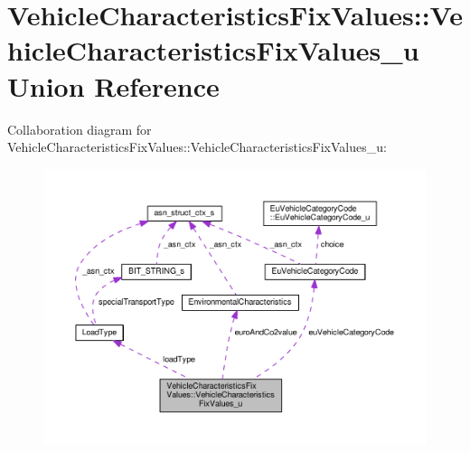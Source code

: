 \hypertarget{unionVehicleCharacteristicsFixValues_1_1VehicleCharacteristicsFixValues__u}{}\section{Vehicle\+Characteristics\+Fix\+Values\+:\+:Vehicle\+Characteristics\+Fix\+Values\+\_\+u Union Reference}
\label{unionVehicleCharacteristicsFixValues_1_1VehicleCharacteristicsFixValues__u}


Collaboration diagram for Vehicle\+Characteristics\+Fix\+Values\+:\+:Vehicle\+Characteristics\+Fix\+Values\+\_\+u\+:\nopagebreak
\begin{figure}[H]
\begin{center}
\leavevmode
\includegraphics[width=350pt]{unionVehicleCharacteristicsFixValues_1_1VehicleCharacteristicsFixValues__u__coll__graph}
\end{center}
\end{figure}
